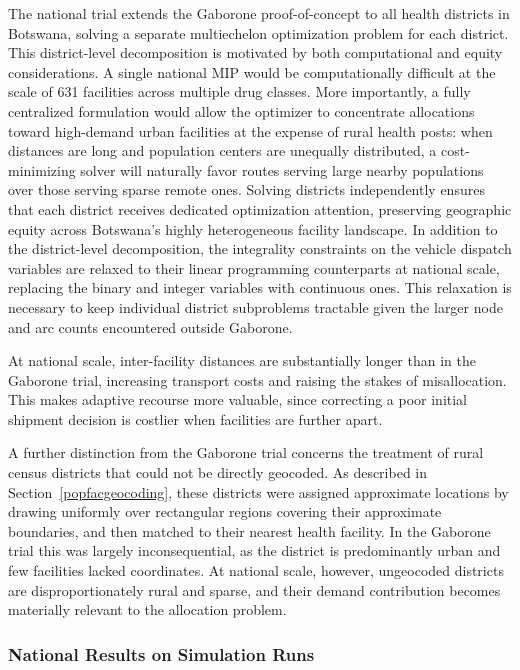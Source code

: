 \documentclass{article}
\begin{document}
The national trial extends the Gaborone proof-of-concept to all health districts in Botswana, solving a separate multiechelon optimization problem for each district. This district-level decomposition is motivated by both computational and equity considerations. A single national MIP would be computationally difficult at the scale of 631 facilities across multiple drug classes. More importantly, a fully centralized formulation would allow the optimizer to concentrate allocations toward high-demand urban facilities at the expense of rural health posts: when distances are long and population centers are unequally distributed, a cost-minimizing solver will naturally favor routes serving large nearby populations over those serving sparse remote ones. Solving districts independently ensures that each district receives dedicated optimization attention, preserving geographic equity across Botswana's highly heterogeneous facility landscape. In addition to the district-level decomposition, the integrality constraints on the vehicle dispatch variables are relaxed to their linear programming counterparts at national scale, replacing the binary and integer variables with continuous ones. This relaxation is necessary to keep individual district subproblems tractable given the larger node and arc counts encountered outside Gaborone.

At national scale, inter-facility distances are substantially longer than in the Gaborone trial, increasing transport costs and raising the stakes of misallocation. This makes adaptive recourse more valuable, since correcting a poor initial shipment decision is costlier when facilities are further apart.

A further distinction from the Gaborone trial concerns the treatment of rural census districts that could not be directly geocoded. As described in Section~\ref{popfacgeocoding}, these districts were assigned approximate locations by drawing uniformly over rectangular regions covering their approximate boundaries, and then matched to their nearest health facility. In the Gaborone trial this was largely inconsequential, as the district is predominantly urban and few facilities lacked coordinates. At national scale, however, ungeocoded districts are disproportionately rural and sparse, and their demand contribution becomes materially relevant to the allocation problem.

\subsubsection{National Results on Simulation Runs}
\end{document}
